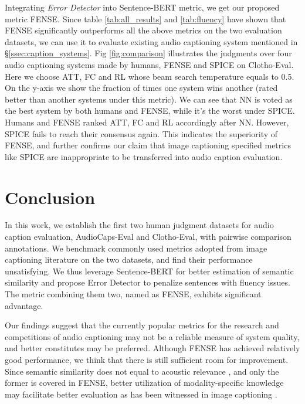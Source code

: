 \documentclass{article}
\begin{document}
Integrating \textit{Error Detector} into Sentence-BERT metric, we get our proposed metric FENSE. Since table \ref{tab:all_results} and \ref{tab:fluency} have shown that FENSE significantly outperforms all the above metrics on the two evaluation datasets, we can use it to evaluate existing audio captioning system mentioned in \S \ref{ssec:caption_systems}. Fig \ref{fig:comparison} illustrates the judgments over four audio captioning systems made by humans, FENSE and SPICE on Clotho-Eval. Here we choose ATT, FC and RL whose beam search temperature equals to 0.5. On the y-axis we show the fraction of times one system wins another (rated better than another systems under this metric). We can see that NN is voted as the best system by both humans and FENSE, while it's the worst under SPICE. Humans and FENSE ranked ATT, FC and RL accordingly after NN. However, SPICE fails to reach their consensus again. This indicates the superiority of FENSE, and further confirms our claim that image captioning specified metrics like SPICE are inappropriate to be transferred into audio caption evaluation. 
\section{Conclusion} 
\label{sec:page}

In this work, we establish the first two human judgment datasets for audio caption evaluation, AudioCaps-Eval and Clotho-Eval, with pairwise comparison annotations. We benchmark commonly used metrics adopted from image captioning literature on the two datasets, and find their performance unsatisfying. We thus leverage Sentence-BERT for better estimation of semantic similarity and propose Error Detector to penalize sentences with fluency issues. The metric combining them two, named as FENSE, exhibits significant advantage.

Our findings suggest that the currently popular metrics for the research and competitions of audio captioning may not be a reliable measure of system quality, and better constitutes may be preferred. Although FENSE has achieved relatively good performance, we think that there is still sufficient room for improvement. Since semantic similarity does not equal to acoustic relevance \cite{Zhang2021EnrichingOW}, and only the former is covered in FENSE, better utilization of modality-specific knowledge may facilitate better evaluation as has been witnessed in image captioning \cite{jiang2019tiger}. 

\vfill
\pagebreak


\end{document}
